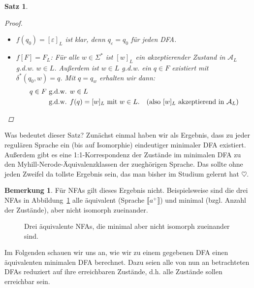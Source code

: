 \documentclass[11pt, a4paper]{article}
\theoremstyle{definition}
\newtheorem*{remark*}{Bemerkung}
\theoremstyle{plain}
\newtheorem{theorem}[definition]{Satz}
\numberwithin{equation}{section}
\begin{document}
\begin{theorem}
\begin{proof}
\begin{itemize}
$$				$$
			\item $f(q_0) = [\varepsilon]_L$ ist klar, denn $q_\varepsilon = q_0$ für jeden DFA.
			\item $f[F] = F_L$: Für alle $w \in \Sigma^\ast$ ist $[w]_L$ ein akzeptierender Zustand in $\mathcal{A}_L$ g.d.w. $w \in L$. Außerdem ist $w \in L$ g.d.w. ein $q \in F$ existiert mit $\delta^\ast(q_0, w) = q$. Mit $q = q_w$ erhalten wir dann:
				\begin{align*}
					q \in F &\text{ g.d.w. } w \in L\\
					&\text{ g.d.w. } f(q) = [w]_L \text{ mit } w \in L. \quad \text{(also } [w]_L \text{ akzeptierend in } \mathcal{A}_L \text{)}\qedhere
				\end{align*} 
		\end{itemize}
	\end{proof}
\end{theorem}
Was bedeutet dieser Satz? Zunächst einmal haben wir als Ergebnis, dass zu jeder regulären Sprache ein (bis auf Isomorphie) eindeutiger minimaler DFA existiert. Außerdem gibt es eine 1:1-Korrespondenz der Zustände im minimalen DFA zu den Myhill-Nerode-Äquivalenzklassen der zueghörigen Sprache. Das sollte ohne jeden Zweifel da tollste Ergebnis sein, das man bisher im Studium gelernt hat $\heartsuit$.
\begin{remark*}
	Für NFAs gilt dieses Ergebnis nicht. Beispielsweise sind die drei NFAs in Abbildung~\ref{fig:3nfas} alle äquivalent (Sprache $\llbracket a^+ \rrbracket$) und minimal (bzgl. Anzahl der Zustände), aber nicht isomorph zueinander.
\end{remark*}
\begin{figure}
	\centering
	\begin{subfigure}[b]{.3\textwidth}
		\centering
		
	\end{subfigure}
	\begin{subfigure}[b]{.3\textwidth}
		\centering
		
	\end{subfigure}
	\begin{subfigure}[b]{.3\textwidth}
		\centering
		
	\end{subfigure}
	\caption{Drei äquivalente NFAs, die minimal aber nicht isomorph zueinander sind.}
	\label{fig:3nfas}
\end{figure}
Im Folgenden schauen wir uns an, wie wir zu einem gegebenen DFA einen äquivalenten minimalen DFA berechnet. Dazu seien alle von nun an betrachteten DFAs reduziert auf ihre erreichbaren Zustände, d.h. alle Zustände sollen erreichbar sein.\par
\end{document}
